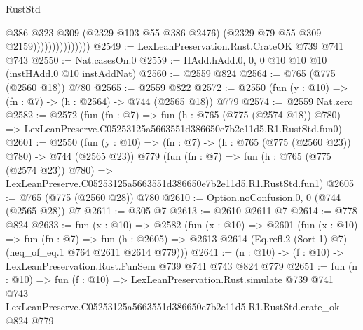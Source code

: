 \begin{lexlean}{RustStd}
\begin{coremodule}
                                @386
                                @323
                                @309
                                (@2329 @103 @55 @386 @2476)
                                (@2329 @79 @55 @309 @2159)))))))))))))))
@2549 := LexLeanPreservation.Rust.CrateOK @739 @741 @743
@2550 := Nat.casesOn.{0}
@2559 := HAdd.hAdd.{0, 0, 0} @10 @10 @10 (instHAdd.{0} @10 instAddNat)
@2560 := @2559 @824
@2564 := @765 (@775 (@2560 @18)) @780
@2565 := @2559 @822
@2572 := @2550 (fun (y : @10) => (fn : @7) -> (h : @2564) -> @744 (@2565 @18)) @779
@2574 := @2559 Nat.zero
@2582 := @2572
    (fun (fn : @7) =>
    fun (h : @765 (@775 (@2574 @18)) @780) =>
    LexLeanPreserve.C05253125a5663551d386650e7b2e11d5.R1.RustStd.fun0)
@2601 := @2550
    (fun (y : @10) => (fn : @7) -> (h : @765 (@775 (@2560 @23)) @780) -> @744 (@2565 @23))
    @779
    (fun (fn : @7) =>
    fun (h : @765 (@775 (@2574 @23)) @780) =>
    LexLeanPreserve.C05253125a5663551d386650e7b2e11d5.R1.RustStd.fun1)
@2605 := @765 (@775 (@2560 @28)) @780
@2610 := Option.noConfusion.{0, 0} (@744 (@2565 @28)) @7
@2611 := @305 @7
@2613 := @2610 @2611 @7
@2614 := @778 @824
@2633 := fun (x : @10) =>
  @2582
    (fun (x : @10) =>
    @2601
      (fun (x : @10) =>
      fun (fn : @7) =>
      fun (h : @2605) =>
      @2613 @2614 (Eq.refl.{2} (Sort 1) @7) (heq_of_eq.{1} @764 @2611 @2614 @779)))
@2641 := (n : @10) -> (f : @10) -> LexLeanPreservation.Rust.FunSem @739 @741 @743 @824 @779
@2651 := fun (n : @10) =>
  fun (f : @10) =>
  LexLeanPreservation.Rust.simulate
    @739
    @741
    @743
    LexLeanPreserve.C05253125a5663551d386650e7b2e11d5.R1.RustStd.crate_ok
    @824
    @779
\end{coremodule}
\end{lexlean}
